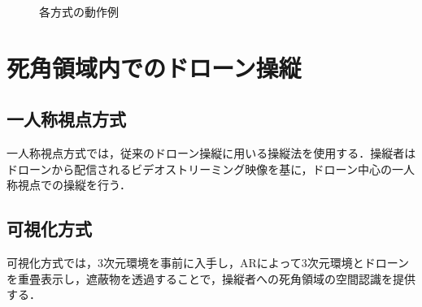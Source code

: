\documentclass[a4paper,10pt,twocolumn,upLatex]{jsarticle}
\begin{document}
\begin{figure}[t]
\begin{center}
  \vspace{-2mm}
  \caption{各方式の動作例}
  \label{fig:flow}
\end{center}
\end{figure}

\section{死角領域内でのドローン操縦}
\subsection{一人称視点方式}
一人称視点方式では，従来のドローン操縦に用いる操縦法を使用する．操縦者はドローンから配信されるビデオストリーミング映像を基に，ドローン中心の一人称視点での操縦を行う．

\subsection{可視化方式}
可視化方式では，3次元環境を事前に入手し，ARによって3次元環境とドローンを重畳表示し，遮蔽物を透過することで，操縦者への死角領域の空間認識を提供する．
\end{document}
